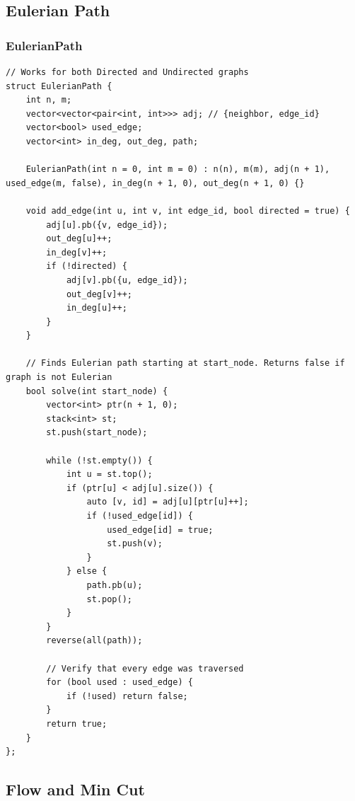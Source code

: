 \documentclass[9pt,a4paper,twocolumn]{extarticle}
\begin{document}
\subsection{Eulerian Path}

\filbreak
\subsubsection{EulerianPath}
\nopagebreak
\begin{lstlisting}
// Works for both Directed and Undirected graphs
struct EulerianPath {
    int n, m;
    vector<vector<pair<int, int>>> adj; // {neighbor, edge_id}
    vector<bool> used_edge;
    vector<int> in_deg, out_deg, path;

    EulerianPath(int n = 0, int m = 0) : n(n), m(m), adj(n + 1), used_edge(m, false), in_deg(n + 1, 0), out_deg(n + 1, 0) {}

    void add_edge(int u, int v, int edge_id, bool directed = true) {
        adj[u].pb({v, edge_id});
        out_deg[u]++;
        in_deg[v]++;
        if (!directed) {
            adj[v].pb({u, edge_id});
            out_deg[v]++;
            in_deg[u]++;
        }
    }

    // Finds Eulerian path starting at start_node. Returns false if graph is not Eulerian
    bool solve(int start_node) {
        vector<int> ptr(n + 1, 0);
        stack<int> st;
        st.push(start_node);

        while (!st.empty()) {
            int u = st.top();
            if (ptr[u] < adj[u].size()) {
                auto [v, id] = adj[u][ptr[u]++];
                if (!used_edge[id]) {
                    used_edge[id] = true;
                    st.push(v);
                }
            } else {
                path.pb(u);
                st.pop();
            }
        }
        reverse(all(path));

        // Verify that every edge was traversed
        for (bool used : used_edge) {
            if (!used) return false;
        }
        return true;
    }
};
\end{lstlisting}

\subsection{Flow and Min Cut}
\end{document}
